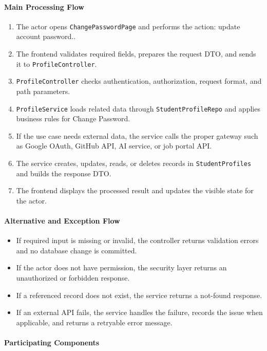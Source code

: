 \paragraph{Main Processing Flow}

\begin{enumerate}
    \item The actor opens \texttt{ChangePasswordPage} and performs the action: update account password..
    \item The frontend validates required fields, prepares the request DTO, and sends it to \texttt{ProfileController}.
    \item \texttt{ProfileController} checks authentication, authorization, request format, and path parameters.
    \item \texttt{ProfileService} loads related data through \texttt{StudentProfileRepo} and applies business rules for Change Password.
    \item If the use case needs external data, the service calls the proper gateway such as Google OAuth, GitHub API, AI service, or job portal API.
    \item The service creates, updates, reads, or deletes records in \texttt{StudentProfiles} and builds the response DTO.
    \item The frontend displays the processed result and updates the visible state for the actor.
\end{enumerate}

\paragraph{Alternative and Exception Flow}

\begin{itemize}
    \item If required input is missing or invalid, the controller returns validation errors and no database change is committed.
    \item If the actor does not have permission, the security layer returns an unauthorized or forbidden response.
    \item If a referenced record does not exist, the service returns a not-found response.
    \item If an external API fails, the service handles the failure, records the issue when applicable, and returns a retryable error message.
\end{itemize}

\paragraph{Participating Components}

